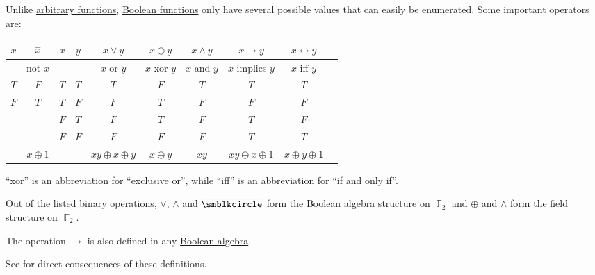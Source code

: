 \begin{definition}\label{def:standard_boolean_functions}
  Unlike \hyperref[def:function]{arbitrary functions}, \hyperref[def:boolean_function]{Boolean functions} only have several possible values that can easily be enumerated. Some important operators are:
  \begin{center}
    \begin{tabular}{c | c || c c | c c c c c c}
      \( x \) & \( \oline{x} \)  & \( x \) & \( y \) & \( x \vee y \)             & \( x \oplus y \)    & \( x \wedge y \)        & \( x \rightarrow y \)   & \( x \leftrightarrow y \) \\
      \hline
              & not \( x \)      &         &         & \( x \) or \( y \)         & \( x \) xor \( y \) & \( x \) and \( y \)     & \( x \) implies \( y \) & \( x \) iff \( y \)       \\
      \hline
      \( T \) & \( F \)          & \( T \) & \( T \) & \( T \)                    & \( F \)             & \( T \)                 & \( T \)                 & \( T \)                   \\
      \( F \) & \( T \)          & \( T \) & \( F \) & \( F \)                    & \( T \)             & \( F \)                 & \( F \)                 & \( F \)                   \\
              &                  & \( F \) & \( T \) & \( F \)                    & \( T \)             & \( F \)                 & \( T \)                 & \( F \)                   \\
              &                  & \( F \) & \( F \) & \( F \)                    & \( F \)             & \( F \)                 & \( T \)                 & \( T \)                   \\
      \hline
              & \( x \oplus 1 \) &         &         & \( xy \oplus x \oplus y \) & \( x \oplus y \)    & \( xy \)            & \( xy \oplus x \oplus 1 \) & \( x \oplus y \oplus 1 \)
    \end{tabular}
  \end{center}
\end{definition}
\begin{comments}
  \item \enquote{xor} is an abbreviation for \enquote{exclusive or}, while \enquote{iff} is an abbreviation for \enquote{if and only if}.

  \item Out of the listed binary operations, \( \vee \), \( \wedge \) and \( \oline{\anon} \) form the \hyperref[def:boolean_algebra]{Boolean algebra} structure on \( \BbbF_2 \) and \( \oplus \) and \( \wedge \) form the \hyperref[def:field]{field} structure on \( \BbbF_2 \).

  \item The operation \( \rightarrow \) is also defined in any \hyperref[def:boolean_algebra]{Boolean algebra}.

  \item See  for direct consequences of these definitions.
\end{comments}

